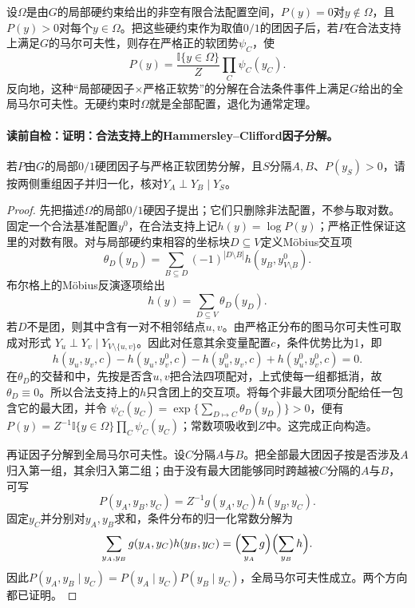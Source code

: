 \label{struct:V3-C06-CH12}
\begin{theorem}\label{thm:V3-C06-hc}
设$\Omega$是由$G$的局部硬约束给出的非空有限合法配置空间，$P(y)=0$对$y\notin\Omega$，且$P(y)>0$对每个$y\in\Omega$。把这些硬约束作为取值$0/1$的团因子后，若$P$在合法支持上满足$G$的马尔可夫性，则存在严格正的软团势$\psi_C$，使
\[
P(y)=\frac{\mathbb I\{y\in\Omega\}}{Z}\prod_C\psi_C(y_C).
\]
反向地，这种“局部硬因子$\times$严格正软势”的分解在合法条件事件上满足$G$给出的全局马尔可夫性。无硬约束时$\Omega$就是全部配置，退化为通常定理。
\end{theorem}

\label{struct:V3-C06-CH13}
\paragraph{读前自检：证明：合法支持上的Hammersley--Clifford因子分解。}若$P$由$G$的局部$0/1$硬团因子与严格正软团势分解，且$S$分隔$A,B$、$P(y_S)>0$，请按两侧重组因子并归一化，核对$Y_A\perp Y_B\mid Y_S$。\par

\begin{proof}
先把描述$\Omega$的局部$0/1$硬因子提出；它们只删除非法配置，不参与取对数。固定一个合法基准配置$y^0$，在合法支持上记$h(y)=\log P(y)$；严格正性保证这里的对数有限。对与局部硬约束相容的坐标块$D\subseteq V$定义Möbius交互项
\[
\theta_D(y_D)=
\sum_{B\subseteq D}(-1)^{|D\setminus B|}
h(y_B,y^0_{V\setminus B}).
\]
布尔格上的Möbius反演逐项给出
\[
h(y)=\sum_{D\subseteq V}\theta_D(y_D).
\]
若$D$不是团，则其中含有一对不相邻结点$u,v$。由严格正分布的图马尔可夫性可取成对形式
$Y_u\perp Y_v\mid Y_{V\setminus\{u,v\}}$。因此对任意其余变量配置$c$，条件优势比为1，即
\[
h(y_u,y_v,c)-h(y_u,y_v^0,c)
-h(y_u^0,y_v,c)+h(y_u^0,y_v^0,c)=0.
\]
在$\theta_D$的交替和中，先按是否含$u,v$把合法四项配对，上式使每一组都抵消，故$\theta_D\equiv0$。所以合法支持上的$h$只含团上的交互项。将每个非最大团项分配给任一包含它的最大团，并令
$\psi_C(y_C)=\exp\{\sum_{D\mapsto C}\theta_D(y_D)\}>0$，便有
$P(y)=Z^{-1}\mathbb I\{y\in\Omega\}\prod_C\psi_C(y_C)$；常数项吸收到$Z$中。这完成正向构造。

再证因子分解到全局马尔可夫性。设$C$分隔$A$与$B$。把全部最大团因子按是否涉及$A$归入第一组，其余归入第二组；由于没有最大团能够同时跨越被$C$分隔的$A$与$B$，可写
\[
P(y_A,y_B,y_C)=Z^{-1}g(y_A,y_C)h(y_B,y_C).
\]
固定$y_C$并分别对$y_A,y_B$求和，条件分布的归一化常数分解为
\[
\sum_{y_A,y_B}g(y_A,y_C)h(y_B,y_C)
=\Bigl(\sum_{y_A}g\Bigr)\Bigl(\sum_{y_B}h\Bigr).
\]
因此$P(y_A,y_B\mid y_C)=P(y_A\mid y_C)P(y_B\mid y_C)$，全局马尔可夫性成立。两个方向都已证明。
\end{proof}

